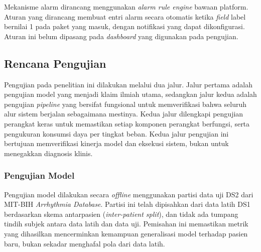Mekanisme alarm dirancang menggunakan \textit{alarm rule engine} bawaan
platform. Aturan yang dirancang membuat entri alarm secara otomatis ketika
\textit{field} label bernilai 1 pada paket yang masuk, dengan notifikasi yang
dapat dikonfigurasi. Aturan ini belum dipasang pada \textit{dashboard} yang
digunakan pada pengujian.



\subsection{Rencana Pengujian}

Pengujian pada penelitian ini dilakukan melalui dua jalur. Jalur pertama adalah pengujian model yang menjadi klaim ilmiah utama, sedangkan jalur kedua adalah pengujian \textit{pipeline} yang bersifat fungsional untuk memverifikasi bahwa seluruh alur sistem berjalan sebagaimana mestinya. Kedua jalur dilengkapi pengujian perangkat keras untuk memastikan setiap komponen perangkat berfungsi, serta pengukuran konsumsi daya per tingkat beban. Kedua jalur pengujian ini bertujuan memverifikasi kinerja model dan eksekusi sistem, bukan untuk menegakkan diagnosis klinis.

\subsubsection{Pengujian Model}

Pengujian model dilakukan secara \textit{offline} menggunakan partisi data uji DS2 dari MIT-BIH \textit{Arrhythmia Database}. Partisi ini telah dipisahkan dari data latih DS1 berdasarkan skema antarpasien (\textit{inter-patient split}), dan tidak ada tumpang tindih subjek antara data latih dan data uji. Pemisahan ini memastikan metrik yang dihasilkan mencerminkan kemampuan generalisasi model terhadap pasien baru, bukan sekadar menghafal pola dari data latih.

